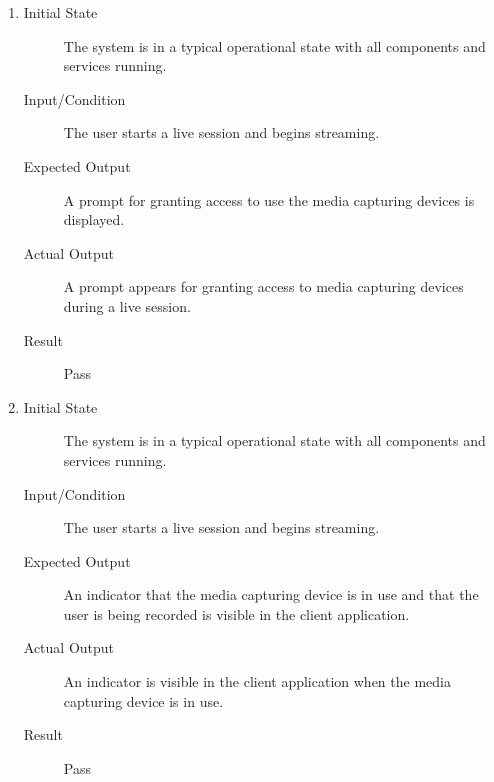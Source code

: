 \documentclass[12pt, titlepage]{article}
\begin{document}
\begin{enumerate}[NFR-T1]
  \item \label{NFRT24}
    \begin{description}
    \item[Initial State] The system is in a typical operational state with all
      components and services running.
    \item[Input/Condition] The user starts a live session and begins streaming.
    \item[Expected Output] A prompt for granting access to use the media capturing
      devices is displayed.
    \item[Actual Output] A prompt appears for granting access to media capturing 
    devices during a live session.
    \item[Result] Pass 
    \end{description}
  \item \label{NFRT25}
    \begin{description}
    \item[Initial State] The system is in a typical operational state with all
      components and services running.
    \item[Input/Condition] The user starts a live session and begins streaming.
    \item[Expected Output] An indicator that the media capturing device is in use
      and that the user is being recorded is visible in the client application.
    \item[Actual Output] An indicator is visible in the client application when 
    the media capturing device is in use.
    \item[Result] Pass 
    \end{description}

\end{enumerate}
\end{document}
